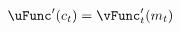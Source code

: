   \begin{equation}\begin{gathered}\begin{aligned}
        \uFunc^{\prime}({c}_{t})  & = \null{\vFunc}^{\prime}_{t}({m}_{t})\label{eq:Envelope}
      \end{aligned}\end{gathered}\end{equation}
